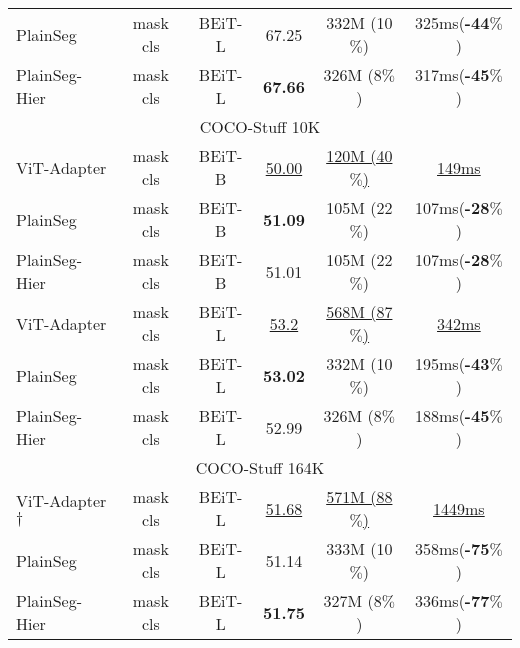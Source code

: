 \documentclass{article} \usepackage{iclr2024_conference,times}
\begin{document}
\begin{table}[h]
\begin{center}
\begin{tabular}{l|ccccc}
PlainSeg &mask cls &BEiT-L &67.25  &332M (10$\%$)  &325ms(\textbf{-44$\%$}) \\
PlainSeg-Hier &mask cls &BEiT-L &\textbf{67.66}  &326M (8$\%$)  &317ms(\textbf{-45$\%$}) \\\midrule\midrule
\multicolumn{6}{c}{COCO-Stuff 10K} \\ \midrule
ViT-Adapter  &mask cls  &BEiT-B &\uline{50.00} &\uline{120M (40$\%$)}  & \uline{149ms}\\
PlainSeg &mask cls &BEiT-B &\textbf{51.09}  &105M (22$\%$) &107ms(\textbf{-28$\%$})  \\
PlainSeg-Hier &mask cls &BEiT-B &51.01  &105M (22$\%$) &107ms(\textbf{-28$\%$})  \\
ViT-Adapter  &mask cls  &BEiT-L &\uline{53.2} &\uline{568M (87$\%$)}   &\uline{342ms}\\
PlainSeg &mask cls &BEiT-L &\textbf{53.02}  &332M (10$\%$) &195ms(\textbf{-43$\%$})  \\
PlainSeg-Hier &mask cls &BEiT-L &52.99  &326M (8$\%$) &188ms(\textbf{-45$\%$})  \\\midrule\midrule
\multicolumn{6}{c}{COCO-Stuff 164K} \\ \midrule
ViT-Adapter$\dagger$  &mask cls  &BEiT-L &\uline{51.68} &\uline{571M (88$\%$)}  &\uline{1449ms} \\
PlainSeg &mask cls &BEiT-L &51.14  &333M (10$\%$) &358ms(\textbf{-75$\%$})   \\
PlainSeg-Hier &mask cls &BEiT-L &\textbf{51.75}  &327M (8$\%$) &336ms(\textbf{-77$\%$})   \\
\bottomrule
\end{tabular}
\end{center}
\end{table}
\end{document}
